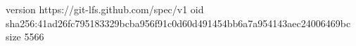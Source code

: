 version https://git-lfs.github.com/spec/v1
oid sha256:41ad26fc795183329bcba956f91c0d60d491454bb6a7a954143aec24006469bc
size 5566
